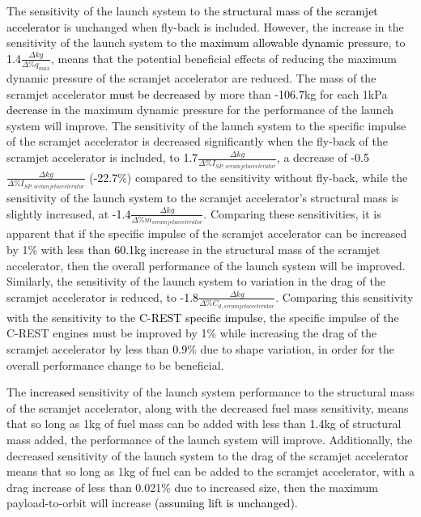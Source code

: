 The sensitivity of the launch system to the \textcolor{black}{structural mass of the scramjet accelerator} is unchanged when fly-back is included. However, the increase in the sensitivity of the launch system to the \textcolor{black}{maximum allowable dynamic pressure}, to \textcolor{black}{1.4}$\frac{\Delta kg}{\Delta\%q_{max}}$, means that the potential beneficial effects of reducing the maximum dynamic pressure of the scramjet accelerator are reduced. The mass of the scramjet accelerator \textcolor{black}{must be decreased} by more than \textcolor{black}{-106.7}kg for each 1kPa \textcolor{black}{decrease} in the maximum dynamic pressure for the performance of the launch system will improve.
 The sensitivity of the launch system to the specific impulse of the scramjet accelerator is decreased significantly when the fly-back of the scramjet accelerator is included, to \textcolor{black}{1.7}$\frac{\Delta kg}{\Delta\%I_{SP,scramjet accelerator}}$, a decrease of \textcolor{black}{-0.5}$\frac{\Delta kg}{\Delta\%I_{SP,scramjet accelerator}}$ (\textcolor{black}{-22.7}\%) compared to the sensitivity without fly-back, while the sensitivity of the launch system to the scramjet accelerator's structural mass is slightly increased, at \textcolor{black}{-1.4}$\frac{\Delta kg}{\Delta\%m_{scramjet accelerator}}$. Comparing these sensitivities, it is apparent that if the specific impulse of the scramjet accelerator can be increased by 1\% with less than \textcolor{black}{60.1kg} increase in the structural mass of the scramjet accelerator, then the overall performance of the launch system will be improved.  
Similarly, the sensitivity of the launch system to variation in the drag of the scramjet accelerator is reduced, to \textcolor{black}{-1.8}$\frac{\Delta kg}{\Delta\%C_{d,scramjet accelerator}}$. Comparing this sensitivity with the sensitivity to the \textcolor{black}{C-REST specific impulse}, the specific impulse of the C-REST engines must be improved by 1\% while increasing the drag of the scramjet accelerator by less than \textcolor{black}{0.9}\% due to shape variation, in order for the overall performance change to be beneficial. 

The \textcolor{black}{increased} sensitivity of the launch system performance to the structural mass of the scramjet accelerator, along with the decreased fuel mass sensitivity, means that so long as 1kg of fuel mass can be added with less than \textcolor{black}{1.4}kg of structural mass added, the performance of the launch system will improve. Additionally, the decreased sensitivity of the launch system to the drag of the scramjet accelerator means that so long as 1kg of fuel can be added to the scramjet accelerator, with a drag increase of less than 0.021\% due to increased size, then the maximum payload-to-orbit will increase \textcolor{black}{(assuming lift is unchanged)}. 

